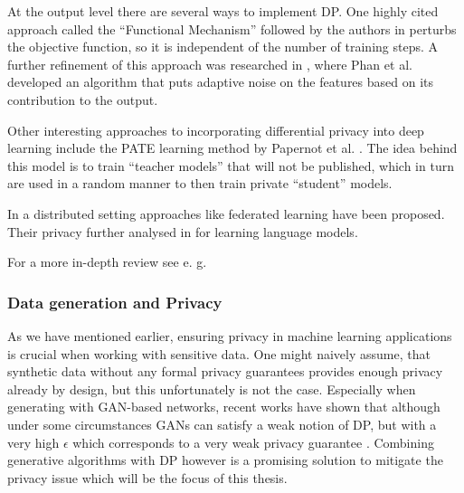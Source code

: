 At the output level there are several ways to implement DP. One highly cited approach called the ``Functional Mechanism'' followed by the authors in \parencite{zhang2012functional} perturbs the objective function, so it is independent of the number of training steps. A further refinement of this approach was researched in \parencite{adlm2017}, where Phan et al. developed an algorithm that puts adaptive noise on the features based on its contribution to the output.

Other interesting approaches to incorporating differential privacy into deep learning include the PATE learning method by Papernot et al. \parencite{papernot2017semisupervised}. The idea behind this model is to train ``teacher models'' that will not be published, which in turn are used in a random manner to then train private ``student'' models. 

In a distributed setting approaches like federated learning \parencite{konečný2015federated,Mo2019EfficientAP} have been proposed. Their privacy further analysed in \parencite{mcmahan2018learning} for learning language models.

\vspace*{1em}
For a more in-depth review see e. g. \parencite{surrve_ppml,surv_ppml_2,wang2023differential}


\subsubsection*{Data generation and Privacy}

As we have mentioned earlier, ensuring privacy in machine learning applications is crucial when working with sensitive data. One might naively assume, that synthetic data without any formal privacy guarantees provides enough privacy already by design, but this unfortunately is not the case. Especially when generating with GAN-based networks, recent works have shown that although under some circumstances GANs can satisfy a weak notion of DP, but with a very high $\epsilon$ which corresponds to a very weak privacy guarantee \parencite{lin2021privacy,stadler2022synthetic,jordon2022synthetic}. Combining generative algorithms with DP however is a promising solution to mitigate the privacy issue \parencite{bellovin2019privacy} which will be the focus of this thesis.

